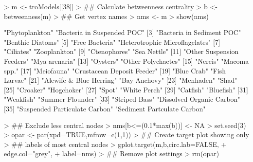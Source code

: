 \documentclass[article]{jss}
\begin{document}
\begin{Schunk}
\begin{Sinput}
> m <- troModels[[38]]
> ## Calculate betweenness centrality
> b <- betweenness(m)
> ## Get vertex names
> nms <- m%
> show(nms)
\end{Sinput}
\begin{Soutput}
 [1] "Phytoplankton"                 "Bacteria in Suspended POC"    
 [3] "Bacteria in Sediment POC"      "Benthic Diatoms"              
 [5] "Free Bacteria"                 "Heterotrophic Microflagelates"
 [7] "Ciliates"                      "Zooplankton"                  
 [9] "Ctenophores"                   "Sea Nettle"                   
[11] "Other Suspension Feeders"      "Mya arenaria"                 
[13] "Oysters"                       "Other Polychaetes"            
[15] "Nereis"                        "Macoma spp."                  
[17] "Meiofauna"                     "Crustacean Deposit Feeder"    
[19] "Blue Crab"                     "Fish Larvae"                  
[21] "Alewife & Blue Herring"        "Bay Anchovy"                  
[23] "Menhaden"                      "Shad"                         
[25] "Croaker"                       "Hogchoker"                    
[27] "Spot"                          "White Perch"                  
[29] "Catfish"                       "Bluefish"                     
[31] "Weakfish"                      "Summer Flounder"              
[33] "Striped Bass"                  "Dissolved Organic Carbon"     
[35] "Suspended Particulate Carbon"  "Sediment Partculate Carbon"   
\end{Soutput}
\begin{Sinput}
> ## Exclude less central nodes
> nms[b<=(0.1*max(b))] <- NA
> set.seed(3)
> opar <- par(xpd=TRUE,mfrow=c(1,1))
> ## Create target plot showing only
> ## labels of most central nodes
> gplot.target(m,b,circ.lab=FALSE,
+               edge.col="grey",
+               label=nms)
> ## Remove plot settings
> rm(opar)
\end{Sinput}
\end{Schunk}
\end{document}
